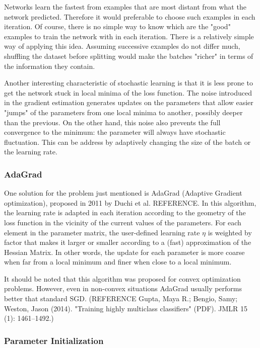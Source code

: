 \documentclass{article}
\begin{document}
Networks learn the fastest from examples that are most distant from what the network predicted. Therefore it would preferable to choose such examples in each iteration. Of course, there is no simple way to know which are the "good" examples to train the network with in each iteration. There is a relatively simple way of applying this idea. Assuming successive examples do not differ much, shuffling the dataset before splitting would make the batches "richer" in terms of the information they contain.

Another interesting characteristic of stochastic learning is that it is less prone to get the network stuck in local minima of the loss function. The noise introduced in the gradient estimation generates updates on the parameters that allow easier "jumps" of the parameters from one local minima to another, possibly deeper than the previous. On the other hand, this noise also prevents the full convergence to the minimum: the parameter will always have stochastic fluctuation. This can be address by  adaptively changing the size of the batch or the learning rate.

\subsubsection{AdaGrad}
\label{subsubsec:Adagrad}
One solution for the problem just mentioned is AdaGrad (Adaptive Gradient optimization), proposed in 2011 by Duchi et al. REFERENCE. In this algorithm, the learning rate is adapted in each iteration according to the geometry of the loss function in the vicinity of the current values of the parameters. For each element in the parameter matrix, the user-defined learning rate $\eta$ is weighted by factor that makes it larger or smaller according to a (fast) approximation of the Hessian Matrix. In other words, the update for each parameter is more coarse when far from a local minimum and finer when close to a local minimum.

It should be noted that this algorithm was proposed for convex optimization problems. However, even in non-convex situations AdaGrad usually performs better that standard SGD. (REFERENCE  Gupta, Maya R.; Bengio, Samy; Weston, Jason (2014). "Training highly multiclass classifiers" (PDF). JMLR 15 (1): 1461–1492.)

\subsubsection{Parameter Initialization}
\end{document}
